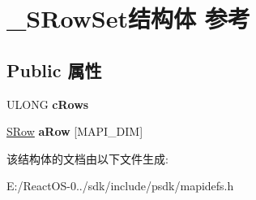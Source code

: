 \hypertarget{struct___s_row_set}{}\section{\+\_\+\+S\+Row\+Set结构体 参考}
\label{struct___s_row_set}
\subsection*{Public 属性}
\begin{DoxyCompactItemize}
\item 
\mbox{\label{struct___s_row_set_aaa6d1ef26f173461e83b887d57ea10bf}} 
U\+L\+O\+NG {\bfseries c\+Rows}
\item 
\mbox{\label{struct___s_row_set_ab0df2b9a00917e354173659a70179fc3}} 
\hyperlink{struct___s_row}{S\+Row} {\bfseries a\+Row} \mbox{[}M\+A\+P\+I\+\_\+\+D\+IM\mbox{]}
\end{DoxyCompactItemize}


该结构体的文档由以下文件生成\+:\begin{DoxyCompactItemize}
\item 
E\+:/\+React\+O\+S-\/0../sdk/include/psdk/mapidefs.\+h\end{DoxyCompactItemize}
